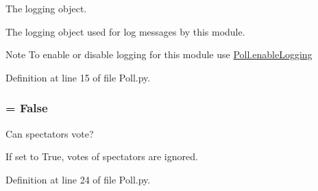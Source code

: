 \-The logging object. 

\-The logging object used for log messages by this module. \begin{DoxyNote}{\-Note}
\-To enable or disable logging for this module use \hyperlink{namespace_poll_a611264a388beae4d03f30fdd38caac99}{\-Poll.\-enable\-Logging} 
\end{DoxyNote}


\-Definition at line 15 of file \-Poll.\-py.

\hypertarget{namespace_poll_af31724cfe1530e7ef893bd510d6db6c0}{
\subsubsection[{spec\-\_\-allowed}]{ = \-False}}
\label{namespace_poll_af31724cfe1530e7ef893bd510d6db6c0}


\-Can spectators vote? 

\-If set to \-True, votes of spectators are ignored. 

\-Definition at line 24 of file \-Poll.\-py.

